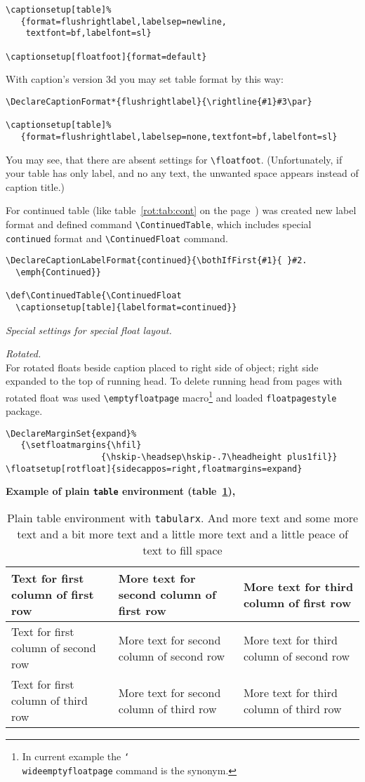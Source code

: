 \documentclass{book}
\newcommand\Continued{}
\def\ContinuedTable{\ContinuedFloat\def\Continued{. \emph{Continued}}\caption{}}
\newcommand\TABULARX[1][]{\begin{tabularx}{\hsize}{|X|X|X|}
\hline
Text for first column of first row#1&
    More text for second column of first row#1&
        More text for third column of first row#1\\\hline
Text for first column of second row#1&
    More text for second column of second row#1&
        More text for third column of second row#1\\\hline
Text for first column of third row#1&
    More text for second column of third row#1&
        More text for third column of third row#1\\\hline
\end{tabularx}}
\providecommand*{\pkg}[1]{\texttt{#1}}
\providecommand*{\env}[1]{\texttt{#1}}
\providecommand*{\com}[1]{\texttt{\char`\\#1}}
\def\text{And more text and some more text and a bit more text and
a little more text and a little peace of text to fill space}
\begin{document}
\begin{sl}
\begin{verbatim}
\captionsetup[table]%
   {format=flushrightlabel,labelsep=newline,
    textfont=bf,labelfont=sl}

\captionsetup[floatfoot]{format=default}
\end{verbatim}
With caption's version 3d you may set table format by this way:
\begin{verbatim}
\DeclareCaptionFormat*{flushrightlabel}{\rightline{#1}#3\par}

\captionsetup[table]%
   {format=flushrightlabel,labelsep=none,textfont=bf,labelfont=sl}
\end{verbatim}
You may see, that there are absent settings for \verb|\floatfoot|.
(Unfortunately, if your table has only label, and no any text, the unwanted
space appears instead of caption title.)

For continued table (like table~\ref{rot:tab:cont} on the page~\pageref{rot:tab:cont})
was created new label format and defined command \verb|\ContinuedTable|, which includes
special \texttt{continued} format and \verb|\ContinuedFloat| command.
\begin{verbatim}
\DeclareCaptionLabelFormat{continued}{\bothIfFirst{#1}{ }#2.
  \emph{Continued}}

\def\ContinuedTable{\ContinuedFloat
  \captionsetup[table]{labelformat=continued}}
\end{verbatim}

\emph{Special settings for special float layout.}

\emph{Rotated.}\\
For rotated floats beside caption placed to right side of object;
right side expanded to the top of running head. To delete running head from pages
with rotated float was used \verb|\emptyfloatpage| macro\footnote{In current example the
\protect\com{wideemptyfloatpage} command is the synonym.} and
loaded \pkg{floatpagestyle} package.
\begin{verbatim}
\DeclareMarginSet{expand}%
   {\setfloatmargins{\hfil}
                   {\hskip-\headsep\hskip-.7\headheight plus1fil}}
\floatsetup[rotfloat]{sidecappos=right,floatmargins=expand}
\end{verbatim}

\end{sl}

\clearpage
\bfseries\boldmath
Example of plain \env{table} environment (table~\ref{float:plain:table}),

\begin{table}
\caption{Plain table environment with \env{tabularx}. \text}\label{float:plain:table}
\TABULARX
\end{table}
\end{document}
